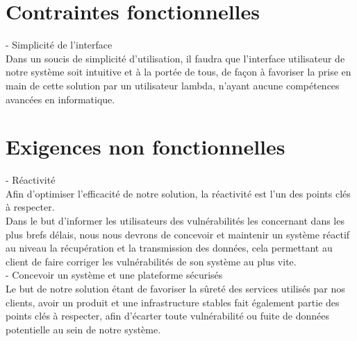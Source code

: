 \section{Contraintes fonctionnelles}
- Simplicité de l'interface\\
Dans un soucis de simplicité d'utilisation, il faudra que l'interface utilisateur de notre système soit intuitive et à la portée de tous, de façon à favoriser la prise en main de cette solution par un utilisateur lambda, n'ayant aucune compétences avancées en informatique.\\

\section{Exigences non fonctionnelles}
- Réactivité\\
Afin d'optimiser l'efficacité de notre solution, la réactivité est l'un des points clés à respecter.\\
Dans le but d'informer les utilisateurs des vulnérabilités les concernant dans les plus brefs délais, nous nous devrons de concevoir et maintenir un système réactif au niveau la récupération et la transmission des données, cela permettant au client de faire corriger les vulnérabilités de son système au plus vite.\\

- Concevoir un système et une plateforme sécurisés\\
Le but de notre solution étant de favoriser la sûreté des services utilisés par nos clients, avoir un produit et une infrastructure stables fait également partie des points clés à respecter, afin d'écarter toute vulnérabilité ou fuite de données potentielle au sein de notre système.\\
